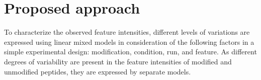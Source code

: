 \documentclass{mcp}
\begin{document}
%
%


\section{Proposed approach}
\label{sec:prop}

To characterize the observed feature intensities, different levels of variations are expressed using linear mixed models in consideration of the following factors in a simple experimental design: modification, condition, run, and feature. As different degrees of variability are present in the feature intensities of modified and unmodified peptides, they are expressed by separate models.
\end{document}
